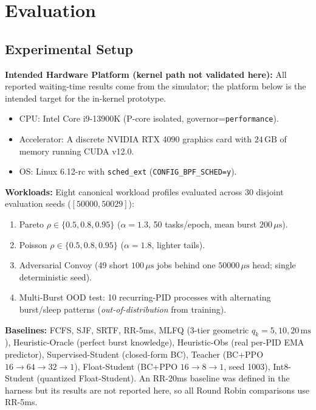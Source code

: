 \section{Evaluation}
\label{sec:eval}

\subsection{Experimental Setup}
\label{subsec:setup}

\textbf{Intended Hardware Platform (kernel path not validated here):} All
reported waiting-time results come from the simulator; the platform below is
the intended target for the in-kernel prototype.
\begin{itemize}
  \item CPU: Intel Core i9-13900K (P-core isolated, governor=\texttt{performance}).
  \item Accelerator: A discrete NVIDIA RTX 4090 graphics card with $24\,\text{GB}$ of memory running CUDA v12.0.
  \item OS: Linux 6.12-rc with \texttt{sched\_ext} (\texttt{CONFIG\_BPF\_SCHED=y}).
\end{itemize}

\textbf{Workloads:} Eight canonical workload profiles evaluated across 30
disjoint evaluation seeds ($[50000, 50029]$):
\begin{enumerate}
  \item Pareto $\rho \in \{0.5, 0.8, 0.95\}$ ($\alpha = 1.3$, 50 tasks/epoch,
    mean burst $200\,\mu\text{s}$).
  \item Poisson $\rho \in \{0.5, 0.8, 0.95\}$ ($\alpha = 1.8$, lighter tails).
  \item Adversarial Convoy (49 short $100\,\mu\text{s}$ jobs behind one
    $50000\,\mu\text{s}$ head; single deterministic seed).
  \item Multi-Burst OOD test: 10 recurring-PID processes with
    alternating burst/sleep patterns (\emph{out-of-distribution} from training).
\end{enumerate}

\textbf{Baselines:} FCFS, SJF, SRTF, RR-5ms, MLFQ (3-tier geometric
$q_k = 5, 10, 20\,\text{ms}$), Heuristic-Oracle (perfect burst knowledge),
Heuristic-Obs (real per-PID EMA predictor), Supervised-Student (closed-form
BC), Teacher (BC+PPO $16\to 64\to 32\to 1$), Float-Student
(BC+PPO $16\to 8\to 1$, seed 1003), Int8-Student (quantized Float-Student). An RR-20ms baseline was defined in the
harness but its results are not reported here, so all Round Robin comparisons
use RR-5ms.

